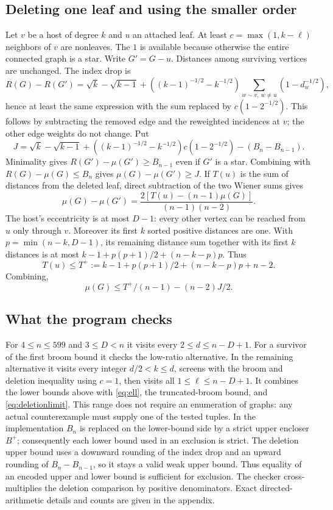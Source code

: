 \subsection{Deleting one leaf and using the smaller order}
Let $v$ be a host of degree $k$ and $u$ an attached leaf.
At least $c=\max(1,k-\ell)$ neighbors of $v$ are nonleaves.
The $1$ is available because otherwise the entire connected graph is
a star. Write $G'=G-u$. Distances among surviving vertices are unchanged.
The index drop is
\[
 R(G)-R(G')=\sqrt k-\sqrt{k-1}
 +( (k-1)^{-1/2}-k^{-1/2})
     \sum_{w\sim v,\ w\ne u}(1-d_w^{-1/2}),
\]
hence at least the same expression with the sum replaced by
$c(1-2^{-1/2})$. This follows by subtracting the removed edge and
the reweighted incidences at $v$; the other edge weights do not change.
Put
\[
 J=\sqrt k-\sqrt{k-1}+( (k-1)^{-1/2}-k^{-1/2})c(1-2^{-1/2})
        -(B_n-B_{n-1}).
\]
Minimality gives $R(G')-\mu(G')\ge B_{n-1}$ even if $G'$ is a star.
Combining with $R(G)-\mu(G)\le B_n$ gives $\mu(G)-\mu(G')\ge J$.
If $T(u)$ is the sum of distances from the deleted leaf, direct subtraction
of the two Wiener sums gives
\[
 \mu(G)-\mu(G')=\frac{2[T(u)-(n-1)\mu(G)]}{(n-1)(n-2)}.
\]
The host's eccentricity is at most $D-1$: every other vertex can be
reached from $u$ only through $v$. Moreover its first $k$ sorted
positive distances are one. With $p=\min(n-k,D-1)$, its remaining
distance sum together with its first $k$ distances is at most
$k-1+p(p+1)/2+(n-k-p)p$. Thus
\[
 T(u)\le T^+:=k-1+p(p+1)/2+(n-k-p)p+n-2.
\]
Combining,
\begin{equation}\label{eq:deletionlimit}
 \mu(G)\le T^+/(n-1)-(n-2)J/2.
\end{equation}

\subsection{What the program checks}
For $4\le n\le599$ and $3\le D<n$ it visits every $2\le d\le n-D+1$.
For a survivor of the first broom bound it checks the low-ratio
alternative. In the remaining alternative it visits every integer
$d/2<k\le d$, screens with the broom and deletion inequality using
$c=1$, then visits all $1\le\ell\le n-D+1$. It combines the lower bounds
above with \eqref{eq:ell}, the truncated-broom bound, and
\eqref{eq:deletionlimit}. This range does not require an enumeration of
graphs: any actual counterexample must supply one of the tested tuples.
In the implementation $B_n$ is replaced on the lower-bound side by a
strict upper encloser $B^+$; consequently each lower bound used in an
exclusion is strict. The deletion upper bound uses a downward
rounding of the index drop and an upward rounding of $B_n-B_{n-1}$,
so it stays a valid weak upper bound. Thus equality of an encoded
upper and lower bound is sufficient for exclusion. The checker
cross-multiplies the deletion comparison by positive denominators.
Exact directed-arithmetic details and counts are given in the appendix.
